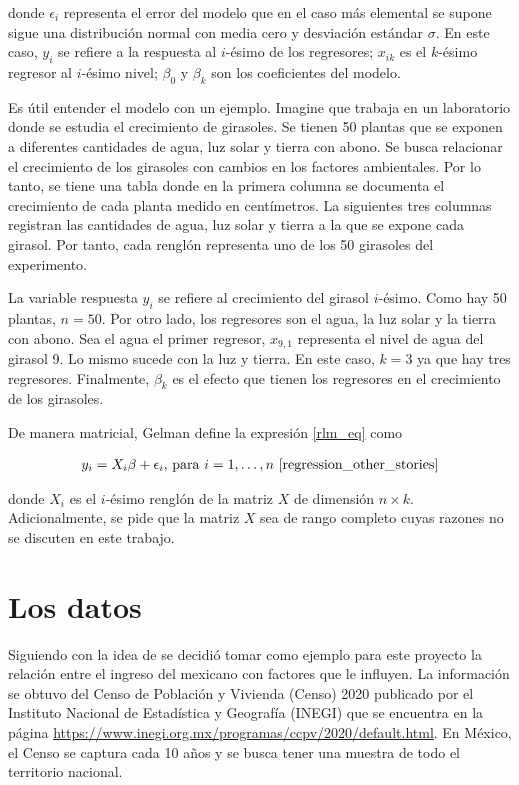 \noindent donde $\epsilon_i$ representa el error del modelo que en el caso más elemental se supone sigue una distribución normal con media cero y desviación estándar $\sigma$. En este caso, $y_i$ se refiere a la respuesta al $i$-ésimo de los regresores; $x_{ik}$ es el $k$-ésimo regresor al $i$-ésimo nivel; $\beta_0$ y $\beta_k$ son los coeficientes del modelo.

Es útil entender el modelo con un ejemplo. Imagine que trabaja en un laboratorio donde se estudia el crecimiento de girasoles. Se tienen 50 plantas que se exponen a diferentes cantidades de agua, luz solar y tierra con abono. Se busca relacionar el crecimiento de los girasoles con cambios en los factores ambientales. Por lo tanto, se tiene una tabla donde en la primera columna se documenta el crecimiento de cada planta medido en centímetros. La siguientes tres columnas registran las cantidades de agua, luz solar y tierra a la que se expone cada girasol. Por tanto, cada renglón representa uno de los 50 girasoles del experimento. 

La variable respuesta $y_i$ se refiere al crecimiento del girasol $i$-ésimo. Como hay 50 plantas, $n = 50$. Por otro lado, los regresores son el agua, la luz solar y la tierra con abono. Sea el agua el primer regresor, $x_{9,1}$ representa el nivel de agua del girasol 9. Lo mismo sucede con la luz y tierra. En este caso, $k = 3$ ya que hay tres regresores. Finalmente, $\beta_k$ es el efecto que tienen los regresores en el crecimiento de los girasoles. 

De manera matricial, Gelman define la expresión \ref{rlm_eq} como 

\begin{equation*}
    \begin{aligned}
    y_i = X_i \beta + \epsilon_i \text{, para } i = 1, \dots, n
    \text{ \cite[p.~146]{regression_other_stories}}
    \end{aligned}
\end{equation*}

\noindent donde $X_i$ es el $i$-ésimo renglón de la matriz $X$ de dimensión $n \times k$. Adicionalmente, se pide que la matriz $X$ sea de rango completo cuyas razones no se discuten en este trabajo. 

\section{Los datos}
Siguiendo con la idea de \cite{seber2003linear} se decidió tomar como ejemplo para este proyecto la relación entre el ingreso del mexicano con factores que le influyen. La información se obtuvo del  Censo de Población y Vivienda (Censo) 2020 publicado por el Instituto Nacional de Estadística y Geografía (INEGI) que se encuentra en la página \url{https://www.inegi.org.mx/programas/ccpv/2020/default.html}. En México, el Censo se captura cada 10 años y se busca tener una muestra de todo el territorio nacional. 

